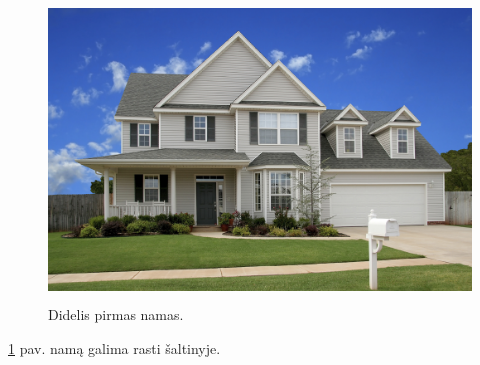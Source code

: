 \documentclass[a4paper,12pt]{article}
\begin{document}
\begin{figure}[!htbp]
\centering
	\includegraphics[height=8cm]{house1}
	\caption{Didelis pirmas namas.}
	\label{fig:2}
\end{figure}

\ref{fig:2} pav. namą galima rasti \cite{namas} šaltinyje.

\newpage

\end{document}

